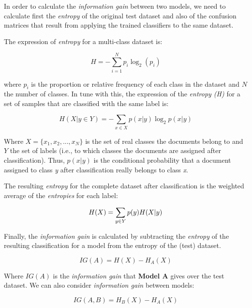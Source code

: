 \documentclass[10pt,journal,compsoc, onecolumn]{IEEEtran}
\begin{document}
In order to calculate the \textit{information gain} between two models, we need to calculate first the \textit{entropy} of the original test dataset and also of the confusion matrices that result from applying the trained classifiers to the same dataset. 

The expression of \textit{entropy} for a multi-class dataset is:

\begin{equation}
    \label{eq:entropy1}
    H = - \sum_{i=1}^{N}  p_i \log_2(p_i)
\end{equation}

where $ p_i $ is the proportion or relative frequency of each class in the dataset and $ N $ the number of classes. In tune with this, the expression of the \textit{entropy (H)} for a set of samples that are classified with the same label is:

\begin{equation} 
\label{eq:entropy2}
    H(X|y \in Y) = - \sum_{x \in X} p(x|y) \log_2 p(x|y) 
\end{equation}

Where $ X = \{ x_1, x_2, ..., x_N\} $ is the set of real classes the documents belong to and $ Y $ the set of labels (i.e., to which classes the documents are assigned after classification). Thus, $ p(x|y) $ is the conditional probability that a document assigned to class \textit{y} after classification really belongs to class \textit{x}.

The resulting \textit{entropy} for the complete dataset after classification is the weighted average of the \textit{entropies} for each label:

\begin{equation} 
\label{eq:entropy3}
    H(X) = \sum_{y \in Y} p(y) \space H(X|y)
\end{equation}

Finally, the \textit{information gain} is calculated by subtracting the \textit{entropy} of the resulting classification for a model from the entropy of the (test) dataset.

\begin{equation} 
\label{eq:infogain1}
    IG(A) = H(X) - H_A(X)
\end{equation}

Where $ IG(A) $ is the \textit{information gain} that \textbf{Model A} gives over the test dataset. We can also consider \textit{information gain} between models:

\begin{equation} 
\label{eq:infogain2}
    IG(A,B) = H_B(X) - H_A(X)
\end{equation}
\end{document}
